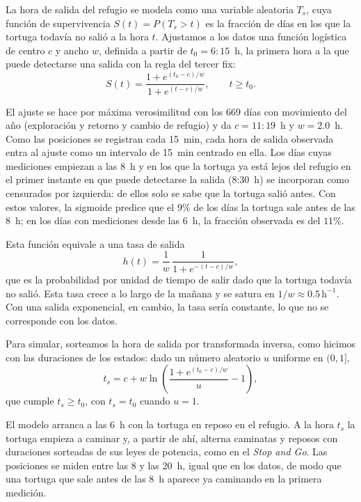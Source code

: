 La hora de salida del refugio se modela como una variable aleatoria $T_s$, cuya función de supervivencia $S(t) = P(T_s > t)$ es la fracción de días en los 
que la tortuga todavía no salió a la hora $t$. Ajustamos a los datos una función logística de centro $c$ y ancho $w$, definida a partir de $t_0 = 6{:}15$~h, 
la primera hora a la que puede detectarse una salida con la regla del tercer fix:
\begin{equation}
    S(t) = \frac{1 + e^{(t_0 - c)/w}}{1 + e^{(t - c)/w}}, \qquad t \geq t_0 .
    \label{eq:supervivencia_salida}
\end{equation}

El ajuste se hace por máxima verosimilitud con los 669 días con movimiento del año (exploración y retorno y cambio de refugio) y da $c = 11{:}19$~h y 
$w = 2.0$~h. Como las posiciones se registran cada 15~min, cada hora de salida observada entra al ajuste como un intervalo de 15~min centrado en ella. 
Los días cuyas mediciones empiezan a las 8~h y en los que la tortuga ya está lejos del refugio en el primer instante en que puede detectarse la salida 
(8{:}30~h) se incorporan como censurados por izquierda: de ellos solo se sabe que la tortuga salió antes. Con estos valores, la sigmoide predice que el $9 \%$ 
de los días la tortuga sale antes de las 8~h; en los días con mediciones desde las 6~h, la fracción observada es del $11 \%$.

Esta función equivale a una tasa de salida
\begin{equation}
    h(t) = \frac{1}{w}\,\frac{1}{1 + e^{-(t-c)/w}},
\end{equation}
que es la probabilidad por unidad de tiempo de salir dado que la tortuga todavía no salió. Esta tasa crece a lo largo de la mañana y se satura en 
$1/w \approx 0.5\,\mathrm{h^{-1}}$. Con una salida exponencial, en cambio, la tasa sería constante, lo que no se corresponde con los datos.

Para simular, sorteamos la hora de salida por transformada inversa, como hicimos con las duraciones de los estados: dado un número aleatorio $u$ uniforme en $(0,1]$,
\begin{equation}
    t_s = c + w \ln\!\left(\frac{1 + e^{(t_0 - c)/w}}{u} - 1\right),
\end{equation}
que cumple $t_s \geq t_0$, con $t_s = t_0$ cuando $u = 1$.

El modelo arranca a las 6~h con la tortuga en reposo en el refugio. A la hora $t_s$ la tortuga empieza a caminar y, a partir de ahí, alterna caminatas 
y reposos con duraciones sorteadas de sus leyes de potencia, como en el \textit{Stop and Go}. Las posiciones se miden entre las 8 y las 20~h, igual que 
en los datos, de modo que una tortuga que sale antes de las 8~h aparece ya caminando en la primera medición.


